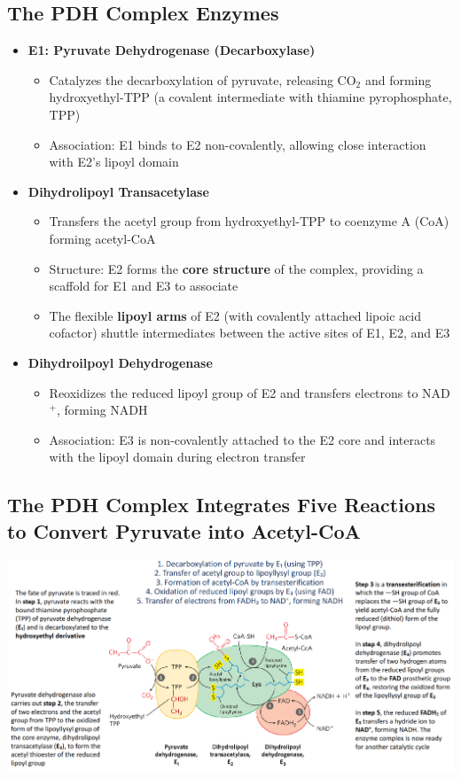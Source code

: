 \documentclass[10pt]{article}
\newcommand{\pc}{$^+$}
\begin{document}
\subsection*{The PDH Complex Enzymes}
\begin{itemize}
	\item \textbf{E1: Pyruvate Dehydrogenase (Decarboxylase)}
	\begin{itemize}
        \item Catalyzes the decarboxylation of pyruvate, releasing CO$_2$ and forming hydroxyethyl-TPP (a covalent intermediate with thiamine pyrophosphate, TPP)
        \item Association: E1 binds to E2 non-covalently, allowing close interaction with E2's lipoyl domain
    \end{itemize}
	\item \textbf{Dihydrolipoyl Transacetylase}
	\begin{itemize}
        \item Transfers the acetyl group from hydroxyethyl-TPP to coenzyme A (CoA) forming acetyl-CoA
        \item Structure: E2 forms the \textbf{core structure} of the complex, providing a scaffold for E1 and E3 to associate
        \item The flexible \textbf{lipoyl arms} of E2 (with covalently attached lipoic acid cofactor) shuttle intermediates between the active sites of E1, E2, and E3
    \end{itemize}
	\item \textbf{Dihydroilpoyl Dehydrogenase}
	\begin{itemize}
        \item Reoxidizes the reduced lipoyl group of E2 and transfers electrons to NAD\pc, forming NADH
        \item Association: E3 is non-covalently attached to the E2 core and interacts with the lipoyl domain during electron transfer
    \end{itemize}
\end{itemize}

\subsection*{The PDH Complex Integrates Five Reactions to Convert Pyruvate into Acetyl-CoA}
\begin{center} 
	\includegraphics*[width=\textwidth]{L3_17.png}
\end{center}
\end{document}
